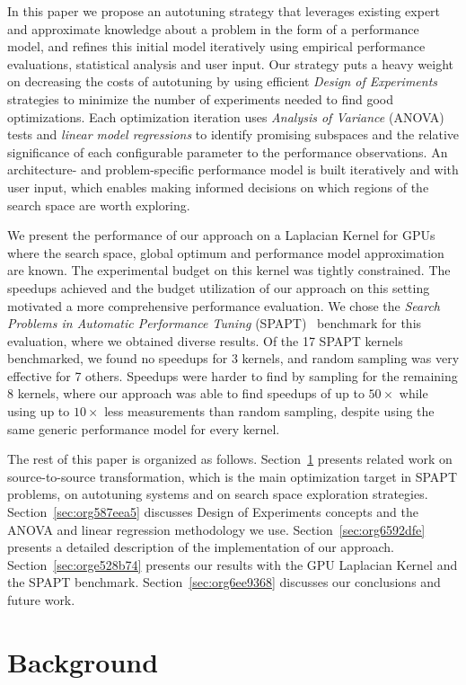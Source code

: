 \documentclass[conference]{IEEEtran}
\begin{document}
In this paper we propose an autotuning strategy that leverages existing expert
and approximate knowledge about a problem in the form of a performance model,
and refines this initial model iteratively using empirical performance
evaluations, statistical analysis and user input. Our strategy puts a heavy
weight on decreasing the costs of autotuning by using efficient \emph{Design of
Experiments} strategies to minimize the number of experiments needed to find
good optimizations. Each optimization iteration uses \emph{Analysis of Variance}
(ANOVA) tests and \emph{linear model regressions} to identify promising subspaces and
the relative significance of each configurable parameter to the performance
observations. An architecture- and problem-specific performance model is built
iteratively and with user input, which enables making informed decisions on
which regions of the search space are worth exploring.

We present the performance of our approach on a Laplacian Kernel for GPUs where
the search space, global optimum and performance model approximation are known.
The experimental budget on this kernel was tightly constrained. The speedups
achieved and the budget utilization of our approach on this setting motivated a
more comprehensive performance evaluation. We chose the \emph{Search Problems in
Automatic Performance Tuning} (SPAPT)~\cite{balaprakash2012spapt}
benchmark for this evaluation, where we obtained diverse results. Of the 17
SPAPT kernels benchmarked, we found no speedups for 3 kernels, and random
sampling was very effective for 7 others. Speedups were harder to find by
sampling for the remaining 8 kernels, where our approach was able to find
speedups of up to \(50\times\) while using up to \(10\times\) less measurements than
random sampling, despite using the same generic performance model for every
kernel.

The rest of this paper is organized as follows. Section~\ref{sec:org4484970}
presents related work on source-to-source transformation, which is the main
optimization target in SPAPT problems, on autotuning systems and on search space
exploration strategies. Section~\ref{sec:org587eea5} discusses Design of
Experiments concepts and the ANOVA and linear regression methodology we use.
Section~\ref{sec:org6592dfe} presents a detailed
description of the implementation of our approach. Section~\ref{sec:orge528b74} presents our results with the GPU Laplacian Kernel and the SPAPT
benchmark. Section~\ref{sec:org6ee9368} discusses our conclusions and future work.
\section{Background}
\label{sec:org4484970}
\end{document}
